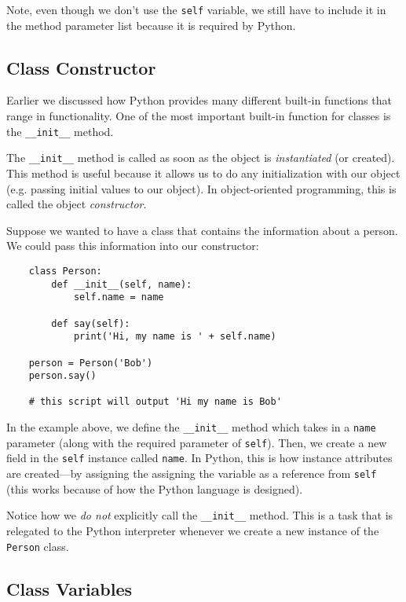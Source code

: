 \documentclass{cslesson}
\begin{document}
Note, even though we don't use the \texttt{self} variable, we still have to include it in the method parameter list because it is required by Python.

\subsection{Class Constructor}
Earlier we discussed how Python provides many different built-in functions that range in functionality. One of the most important built-in function for classes
is the \texttt{\_\_init\_\_} method.

The \texttt{\_\_init\_\_} method is called as soon as the object is \textit{instantiated} (or created). This method is useful because it allows us to do
any initialization with our object (e.g. passing initial values to our object). In object-oriented programming, this is called the object \textit{constructor}.

Suppose we wanted to have a class that contains the information about a person. We could pass this information into our constructor:

\begin{verbatim}
    class Person:
        def __init__(self, name):
            self.name = name

        def say(self):
            print('Hi, my name is ' + self.name)

    person = Person('Bob')
    person.say()

    # this script will output 'Hi my name is Bob'
\end{verbatim}

In the example above, we define the \texttt{\_\_init\_\_} method which takes in a \texttt{name} parameter (along with the required parameter of \texttt{self}).
Then, we create a new field in the \texttt{self} instance called \texttt{name}. In Python, this is how instance attributes are created---by assigning the
assigning the variable as a reference from \texttt{self} (this works because of how the Python language is designed).

Notice how we \textit{do not} explicitly call the \texttt{\_\_init\_\_} method. This is a task that is relegated to the Python interpreter whenever we create
a new instance of the \texttt{Person} class.

\subsection{Class Variables}
\end{document}
